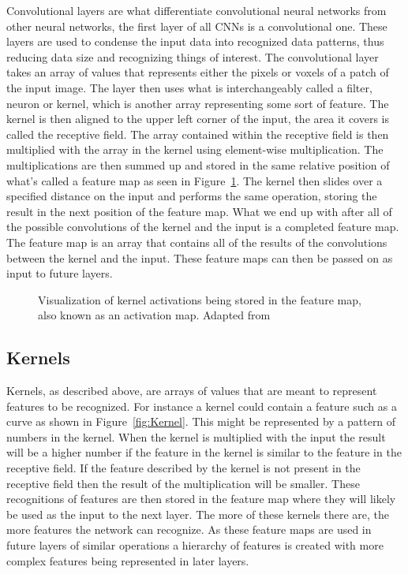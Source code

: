 \documentclass{sig-alternate}
\begin{document}
Convolutional layers are what differentiate convolutional neural networks from other neural networks, the first layer of all CNNs is a convolutional one. These layers are used to condense the input data into recognized data patterns, thus reducing data size and recognizing things of interest. The convolutional layer takes an array of values that represents either the pixels or voxels of a patch of the input image. The layer then uses what is interchangeably called a filter, neuron or kernel, which is another array representing some sort of feature. The kernel is then aligned to the upper left corner of the input, the area it covers is called the receptive field. The array contained within the receptive field is then multiplied with the array in the kernel using element-wise multiplication. The multiplications are then summed up and stored in the same relative position of what's called a feature map as seen in Figure~\ref{fig:ActivationMap}. The kernel then slides over a specified distance on the input and performs the same operation, storing the result in the next position of the feature map. What we end up with after all of the possible convolutions of the kernel and the input is a completed feature map. The feature map is an array that contains all of the results of the convolutions between the kernel and the input. These feature maps can then be passed on as input to future layers.

\begin{figure}
\centering
{}
\caption{Visualization of kernel activations being stored in the feature map, also known as an activation map. Adapted from~\cite{deshpande_2016}}
\label{fig:ActivationMap}
\end{figure}

\subsection{Kernels}
\label{sec:kernels}

Kernels, as described above, are arrays of values that are meant to represent features to be recognized. For instance a kernel could contain a feature such as a curve as shown in Figure~\ref{fig:Kernel}. This might be represented by a pattern of numbers in the kernel. When the kernel is multiplied with the input the result will be a higher number if the feature in the kernel is similar to the feature in the receptive field. If the feature described by the kernel is not present in the receptive field then the result of the multiplication will be smaller. These recognitions of features are then stored in the feature map where they will likely be used as the input to the next layer. The more of these kernels there are, the more features the network can recognize. As these feature maps are used in future layers of similar operations a hierarchy of features is created with more complex features being represented in later layers.
\end{document}
